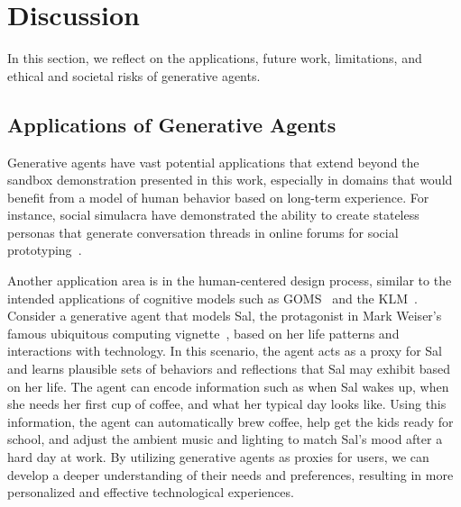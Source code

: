 \section{Discussion}
In this section, we reflect on the applications, future work, limitations, and ethical and societal risks of generative agents.

\subsection{Applications of Generative Agents}
Generative agents have vast potential applications that extend beyond the sandbox demonstration presented in this work, especially in domains that would benefit from a model of human behavior based on long-term experience. For instance, social simulacra have demonstrated the ability to create stateless personas that generate conversation threads in online forums for social prototyping~\cite{9_park2022socialsimulacra}. 

Another application area is in the human-centered design process, similar to the intended applications of cognitive models such as GOMS~\cite{john1996goms} and the KLM~\cite{card1980keystroke}. Consider a generative agent that models Sal, the protagonist in Mark Weiser's famous ubiquitous computing vignette~\cite{weiser1991computer}, based on her life patterns and interactions with technology. In this scenario, the agent acts as a proxy for Sal and learns plausible sets of behaviors and reflections that Sal may exhibit based on her life. The agent can encode information such as when Sal wakes up, when she needs her first cup of coffee, and what her typical day looks like. Using this information, the agent can automatically brew coffee, help get the kids ready for school, and adjust the ambient music and lighting to match Sal's mood after a hard day at work. By utilizing generative agents as proxies for users, we can develop a deeper understanding of their needs and preferences, resulting in more personalized and effective technological experiences.

